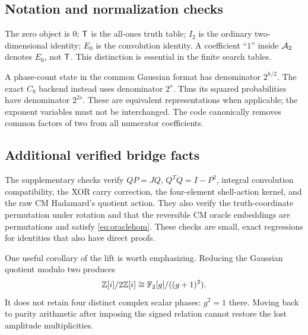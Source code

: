 \subsection{Notation and normalization checks}
The zero object is $0$; $\mathsf T$ is the all-ones truth table; $I_2$ is the ordinary two-dimensional identity; $E_0$ is the convolution identity. A coefficient ``$1$'' inside $\mathcal A_2$ denotes $E_0$, not $\mathsf T$. This distinction is essential in the finite search tables.

A phase-count state in the common Gaussian format has denominator $2^{h/2}$. The exact $C_8$ backend instead uses denominator $2^s$. Thus its squared probabilities have denominator $2^{2s}$. These are equivalent representations when applicable; the exponent variables must not be interchanged. The code canonically removes common factors of two from all numerator coefficients.

\subsection{Additional verified bridge facts}
The supplementary checks verify $QP=JQ$, $Q^TQ=I-P^2$, integral convolution compatibility, the XOR carry correction, the four-element shell-action kernel, and the raw CM Hadamard's quotient action. They also verify the truth-coordinate permutation under rotation and that the reversible CM oracle embeddings are permutations and satisfy \cref{eq:oraclehom}. These checks are small, exact regressions for identities that also have direct proofs.

One useful corollary of the lift is worth emphasizing. Reducing the Gaussian quotient modulo two produces
\begin{equation}
 \mathbb Z[i]/2\mathbb Z[i]\cong\mathbb F_2[g]/((g+1)^2).
\end{equation}
It does not retain four distinct complex scalar phases: $g^2=1$ there. Moving back to parity arithmetic after imposing the signed relation cannot restore the lost amplitude multiplicities.

